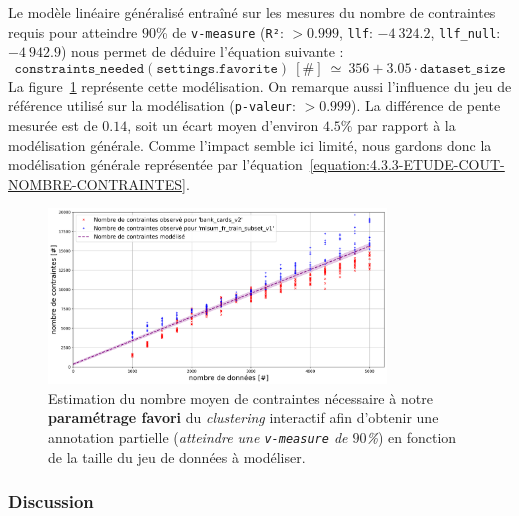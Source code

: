 			Le modèle linéaire généralisé entraîné sur les mesures du nombre de contraintes requis pour atteindre $90$\% de \texttt{v-measure} (\texttt{R²}: $> 0.999$, \texttt{llf}: $-4~324.2$, \texttt{llf\_null}: $-4~942.9$) nous permet de déduire l'équation suivante :
			\begin{equation}
				\label{equation:4.3.3-ETUDE-COUT-NOMBRE-CONTRAINTES}
				\texttt{constraints\_needed}(\texttt{settings.favorite})~[\#]~
				\simeq~356 + 3.05 \cdot \texttt{dataset\_size}
			\end{equation}
			La figure~\ref{figure:4.3.3-ETUDE-COUT-NOMBRE-CONTRAINTES} représente cette modélisation.
			On remarque aussi l'influence du jeu de référence utilisé sur la modélisation (\texttt{p-valeur}: $> 0.999$).
			La différence de pente mesurée est de $0.14$, soit un écart moyen d'environ $4.5$\% par rapport à la modélisation générale.
			Comme l'impact semble ici limité, nous gardons donc la modélisation générale représentée par l'équation~\ref{equation:4.3.3-ETUDE-COUT-NOMBRE-CONTRAINTES}.
			\newline
			\begin{figure}[!htb]
				\centering
				\includegraphics[width=0.8\textwidth]{figures/etude-nombre-contraintes-1-modelisation-nombre}
				\caption{Estimation du nombre moyen de contraintes nécessaire à notre \textbf{paramétrage favori} du \textit{clustering} interactif afin d'obtenir une annotation partielle (\textit{atteindre une \texttt{v-measure} de $90$\%}) en fonction de la taille du jeu de données à modéliser.}
				\label{figure:4.3.3-ETUDE-COUT-NOMBRE-CONTRAINTES}
			\end{figure}

		\subsubsection{Discussion}
		
	
